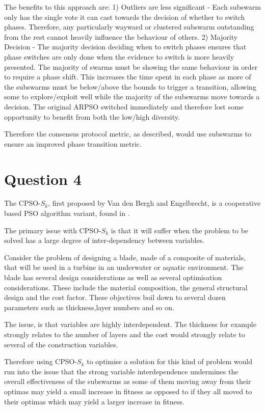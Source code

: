 \documentclass[12pt]{article}
\begin{document}
The benefits to this approach are:
	1) Outliers are less significant - Each subswarm only has the single vote it can cast towards the decision of whether to switch phases. Therefore, any particularly wayward or clustered subswarm outstanding from the rest cannot heavily influence the behaviour of others.
	2) Majority Decision - The majority decision deciding when to switch phases ensures that phase switches are only done when the evidence to switch is more heavily presented. The majority of swarms must be showing the same behaviour in order to require a phase shift. This increases the time spent in each phase as more of the subswarms must be below/above the bounds to trigger a transition, allowing some to explore/exploit well while the majority of the subswarms move towards a decision. The original ARPSO switched immediately and therefore lost some opportunity to benefit from both the low/high diversity.
 
Therefore the consensus protocol metric, as described, would use subswarms to ensure an improved phase transition metric.
\section{Question 4}
The CPSO-$S_k$, first proposed by Van den Bergh and Engelbrecht, is a cooperative based PSO algorithm variant, found in \cite{Bergh00cooperativelearning}.

The primary issue with CPSO-$S_k$ is that it will suffer when the problem to be solved has a large degree of inter-dependency between variables.

Consider the problem of designing a blade, made of a composite of materials, that will be used in a turbine in an underwater or aquatic environment. The blade has several design considerations as well as several optimisation considerations. These include the material composition, the general structural design and the cost factor. These objectives boil down to several dozen parameters such as thickness,layer numbers and so on. 

The issue, is that variables are highly interdependent. The thickness for example strongly relates to the number of layers and the cost would strongly relate to several of the construction variables. 

Therefore using CPSO-$S_k$ to optimise a solution for this kind of problem would run into the issue that the strong variable interdependence undermines the overall effectiveness of the subswarms as some of them moving away from their optimas may yield a small increase in fitness as opposed to if they all moved to their optimas which may yield a larger increase in fitness.
\end{document}

